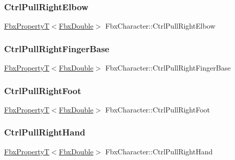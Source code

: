 \subsubsection{\texorpdfstring{Ctrl\+Pull\+Right\+Elbow}{CtrlPullRightElbow}}
{\footnotesize\ttfamily \hyperlink{class_fbx_property_t}{Fbx\+PropertyT}$<$\hyperlink{fbxtypes_8h_a171e72a1c46fc15c1a6c9c31948c1c5b}{Fbx\+Double}$>$ Fbx\+Character\+::\+Ctrl\+Pull\+Right\+Elbow}

\mbox{\label{class_fbx_character_abf8f8567058b002645e8584572139d8e}} 
\subsubsection{\texorpdfstring{Ctrl\+Pull\+Right\+Finger\+Base}{CtrlPullRightFingerBase}}
{\footnotesize\ttfamily \hyperlink{class_fbx_property_t}{Fbx\+PropertyT}$<$\hyperlink{fbxtypes_8h_a171e72a1c46fc15c1a6c9c31948c1c5b}{Fbx\+Double}$>$ Fbx\+Character\+::\+Ctrl\+Pull\+Right\+Finger\+Base}

\mbox{\label{class_fbx_character_ac687c6519770d52f88efad6aa79fb174}} 
\subsubsection{\texorpdfstring{Ctrl\+Pull\+Right\+Foot}{CtrlPullRightFoot}}
{\footnotesize\ttfamily \hyperlink{class_fbx_property_t}{Fbx\+PropertyT}$<$\hyperlink{fbxtypes_8h_a171e72a1c46fc15c1a6c9c31948c1c5b}{Fbx\+Double}$>$ Fbx\+Character\+::\+Ctrl\+Pull\+Right\+Foot}

\mbox{\label{class_fbx_character_a392d76b0a290f80f76f0aa9f7f513345}} 
\subsubsection{\texorpdfstring{Ctrl\+Pull\+Right\+Hand}{CtrlPullRightHand}}
{\footnotesize\ttfamily \hyperlink{class_fbx_property_t}{Fbx\+PropertyT}$<$\hyperlink{fbxtypes_8h_a171e72a1c46fc15c1a6c9c31948c1c5b}{Fbx\+Double}$>$ Fbx\+Character\+::\+Ctrl\+Pull\+Right\+Hand}

